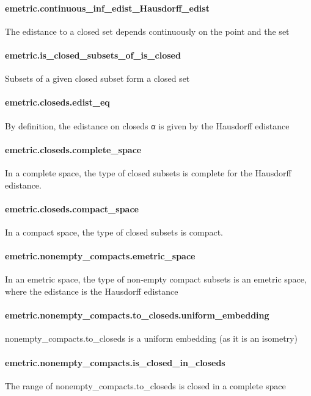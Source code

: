 \documentclass{article}
\begin{document}
\paragraph{emetric.continuous\_inf\_edist\_Hausdorff\_edist}
\par
The edistance to a closed set depends continuously on the point and the set
\paragraph{emetric.is\_closed\_subsets\_of\_is\_closed}
\par
Subsets of a given closed subset form a closed set
\paragraph{emetric.closeds.edist\_eq}
\par
By definition, the edistance on 
\colorbox[RGB]{253,246,227}{{{{\color[RGB]{101, 123, 131} closeds α }}}} is given by the Hausdorff edistance
\paragraph{emetric.closeds.complete\_space}
\par
In a complete space, the type of closed subsets is complete for the
Hausdorff edistance.
\paragraph{emetric.closeds.compact\_space}
\par
In a compact space, the type of closed subsets is compact.
\paragraph{emetric.nonempty\_compacts.emetric\_space}
\par
In an emetric space, the type of non-empty compact subsets is an emetric space,
where the edistance is the Hausdorff edistance
\paragraph{emetric.nonempty\_compacts.to\_closeds.uniform\_embedding}
\par
\colorbox[RGB]{253,246,227}{{{{\color[RGB]{101, 123, 131} nonempty\_compacts.to\_closeds }}}} is a uniform embedding (as it is an isometry)
\paragraph{emetric.nonempty\_compacts.is\_closed\_in\_closeds}
\par
The range of 
\colorbox[RGB]{253,246,227}{{{{\color[RGB]{101, 123, 131} nonempty\_compacts.to\_closeds }}}} is closed in a complete space
\end{document}
